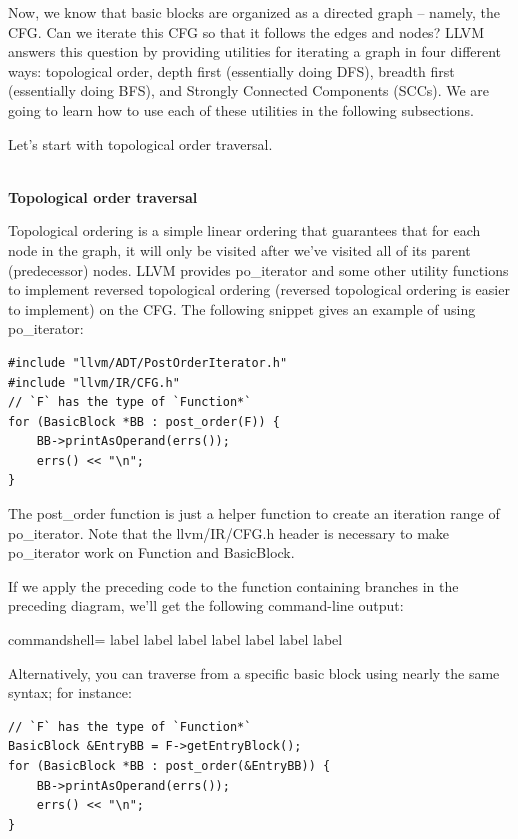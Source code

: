 Now, we know that basic blocks are organized as a directed graph – namely, the CFG. Can we iterate this CFG so that it follows the edges and nodes? LLVM answers this question by providing utilities for iterating a graph in four different ways: topological order, depth first (essentially doing DFS), breadth first (essentially doing BFS), and Strongly Connected Components (SCCs). We are going to learn how to use each of these utilities in the following subsections.

Let's start with topological order traversal.

\hspace*{\fill} \\ %
\noindent
\textbf{Topological order traversal}

Topological ordering is a simple linear ordering that guarantees that for each node in the graph, it will only be visited after we've visited all of its parent (predecessor) nodes. LLVM provides po\_iterator and some other utility functions to implement reversed topological ordering (reversed topological ordering is easier to implement) on the CFG. The following snippet gives an example of using po\_iterator:

\begin{lstlisting}[style=styleCXX]
#include "llvm/ADT/PostOrderIterator.h"
#include "llvm/IR/CFG.h"
// `F` has the type of `Function*`
for (BasicBlock *BB : post_order(F)) {
	BB->printAsOperand(errs());
	errs() << "\n";
}
\end{lstlisting}

The post\_order function is just a helper function to create an iteration range of po\_iterator. Note that the llvm/IR/CFG.h header is necessary to make po\_iterator work on Function and BasicBlock.

If we apply the preceding code to the function containing branches in the preceding diagram, we'll get the following command-line output:

\begin{tcblisting}{commandshell={}}
label %
label %
label %
label %
label %
label %
label %
\end{tcblisting}

Alternatively, you can traverse from a specific basic block using nearly the same syntax; for instance:

\begin{lstlisting}[style=styleCXX]
// `F` has the type of `Function*`
BasicBlock &EntryBB = F->getEntryBlock();
for (BasicBlock *BB : post_order(&EntryBB)) {
	BB->printAsOperand(errs());
	errs() << "\n";
}
\end{lstlisting}

